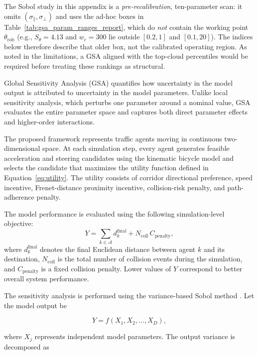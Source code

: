 \documentclass[conference]{IEEEtran}
\begin{document}
The Sobol study in this appendix is a \emph{pre-recalibration}, ten-parameter scan: it omits $(\sigma_{\parallel},\sigma_{\perp})$ and uses the ad-hoc boxes in Table~\ref{tab:gsa_param_ranges_report}, which do \emph{not} contain the working point $\theta_{\mathrm{rob}}$ (e.g., $S_{\theta}=4.13$ and $w_{c}=300$ lie outside $[0.2,1]$ and $[0.1,20]$). The indices below therefore describe that older box, not the calibrated operating region. As noted in the limitations, a GSA aligned with the top-cloud percentiles would be required before treating these rankings as structural.

Global Sensitivity Analysis (GSA) quantifies how uncertainty in the model output is attributed to uncertainty in the model parameters. Unlike local sensitivity analysis, which perturbs one parameter around a nominal value, GSA evaluates the entire parameter space and captures both direct parameter effects and higher-order interactions.

The proposed framework represents traffic agents moving in continuous two-dimensional space. At each simulation step, every agent generates feasible acceleration and steering candidates using the kinematic bicycle model and selects the candidate that maximizes the utility function defined in Equation~\ref{eq:utility}. The utility consists of corridor directional preference, speed incentive, Frenet-distance proximity incentive, collision-risk penalty, and path-adherence penalty.

The model performance is evaluated using the following simulation-level objective:
\begin{equation}
\label{eq:performance_metric_Y}
Y
=
\sum_{k\in\mathcal{A}}
d_k^{\mathrm{final}}
+
N_{\mathrm{coll}}\,C_{\mathrm{penalty}},
\end{equation}
where \(d_k^{\mathrm{final}}\) denotes the final Euclidean distance between agent \(k\) and its destination, \(N_{\mathrm{coll}}\) is the total number of collision events during the simulation, and \(C_{\mathrm{penalty}}\) is a fixed collision penalty. Lower values of \(Y\) correspond to better overall system performance.

The sensitivity analysis is performed using the variance-based Sobol method \cite{sobol1990sensitivity,saltelli2010variance}. Let the model output be

\[
Y=f(X_1,X_2,\ldots,X_D),
\]

where \(X_j\) represents independent model parameters. The output variance is decomposed as
\end{document}
